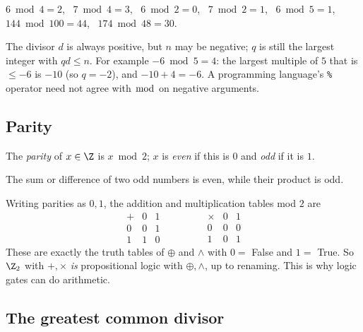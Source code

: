 \begin{example}
$6\bmod4=2$, \ $7\bmod4=3$, \ $6\bmod2=0$, \ $7\bmod2=1$, \ $6\bmod5=1$, \ $144\bmod100=44$, \ $174\bmod48=30$.
\end{example}

\begin{note}[Negative $n$]
The divisor $d$ is always positive, but $n$ may be negative; $q$ is still the largest integer with $qd\le n$. For example $-6\bmod5=4$: the largest multiple of $5$ that is $\le-6$ is $-10$ (so $q=-2$), and $-10+4=-6$. A programming language's \texttt{\%} operator need not agree with $\bmod$ on negative arguments.
\end{note}

\subsection{Parity}
\label{sec:7-4}

\begin{definition}[Parity]
The \emph{parity} of $x\in\Z$ is $x\bmod2$; $x$ is \emph{even} if this is $0$ and \emph{odd} if it is $1$.
\end{definition}

\begin{example}
The sum or difference of two odd numbers is even, while their product is odd.
\end{example}

\begin{note}
Writing parities as $0,1$, the addition and multiplication tables mod $2$ are
\[
\begin{array}{c|cc}
+ & 0 & 1\\\hline
0 & 0 & 1\\
1 & 1 & 0
\end{array}
\qquad\qquad
\begin{array}{c|cc}
\times & 0 & 1\\\hline
0 & 0 & 0\\
1 & 0 & 1
\end{array}
\]
These are exactly the truth tables of $\oplus$ and $\wedge$ with $0=$ False and $1=$ True. So $\Z_2$ with $+,\times$ \emph{is} propositional logic with $\oplus,\wedge$, up to renaming. This is why logic gates can do arithmetic.
\end{note}

\subsection{The greatest common divisor}
\label{sec:7-5}

